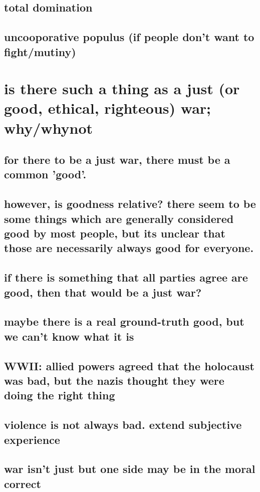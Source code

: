 \documentclass[letterpaper]{article}
\begin{document}
\subsection{total domination}
\label{sec:org5e6f2a6}
\subsection{uncooporative populus (if people don't want to fight/mutiny)}
\label{sec:org33fc941}
\section{is there such a thing as a just (or good, ethical, righteous) war; why/whynot}
\label{sec:org262ac5d}
\subsection{for there to be a just war, there must be a common 'good'.}
\label{sec:org72e0316}
\subsection{however, is goodness relative? there seem to be some things which are generally considered good by most people, but its unclear that those are necessarily always good for everyone.}
\label{sec:org943b728}
\subsection{if there is something that all parties agree are good, then that would be a just war?}
\label{sec:org8d6003b}
\subsection{maybe there is a real ground-truth good, but we can't know what it is}
\label{sec:orge5784ae}
\subsection{WWII: allied powers agreed that the holocaust was bad, but the nazis thought they were doing the right thing}
\label{sec:org38036a1}
\subsection{violence is not always bad. extend subjective experience}
\label{sec:org065106f}
\subsection{war isn't just but one side may be in the moral correct}
\label{sec:orga010421}
\end{document}
